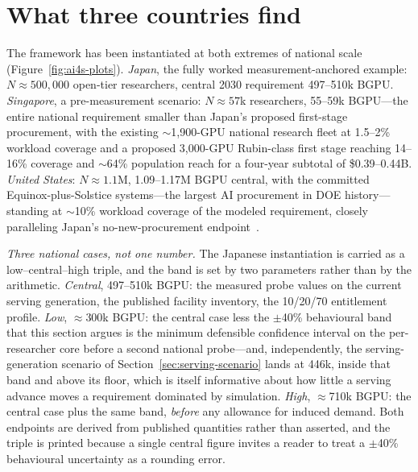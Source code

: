 \section{What three countries find}

The framework has been instantiated at both extremes of national scale (Figure~\ref{fig:ai4s-plots}). \emph{Japan}, the fully worked measurement-anchored example: $N\approx 500{,}000$ open-tier researchers, central 2030 requirement 497--510k BGPU. \emph{Singapore}, a pre-measurement scenario: $N\approx 57$k researchers, 55--59k BGPU---the entire national requirement smaller than Japan's proposed first-stage procurement, with the existing $\sim$1,900-GPU national research fleet at 1.5--2\% workload coverage and a proposed 3,000-GPU Rubin-class first stage reaching 14--16\% coverage and $\sim$64\% population reach for a four-year subtotal of \$0.39--0.44B. \emph{United States}: $N\approx 1.1$M, 1.09--1.17M BGPU central, with the committed Equinox-plus-Solstice systems---the largest AI procurement in DOE history---standing at $\sim$10\% workload coverage of the modeled requirement, closely paralleling Japan's no-new-procurement endpoint~\cite{ai4s-framework}.

\emph{Three national cases, not one number.} The Japanese instantiation is carried as a low--central--high triple, and the band is set by two parameters rather than by the arithmetic. \emph{Central}, 497--510k BGPU: the measured probe values on the current serving generation, the published facility inventory, the 10/20/70 entitlement profile. \emph{Low}, $\approx$300k BGPU: the central case less the $\pm$40\% behavioural band that this section argues is the minimum defensible confidence interval on the per-researcher core before a second national probe---and, independently, the serving-generation scenario of Section~\ref{sec:serving-scenario} lands at 446k, inside that band and above its floor, which is itself informative about how little a serving advance moves a requirement dominated by simulation. \emph{High}, $\approx$710k BGPU: the central case plus the same band, \emph{before} any allowance for induced demand. Both endpoints are derived from published quantities rather than asserted, and the triple is printed because a single central figure invites a reader to treat a $\pm$40\% behavioural uncertainty as a rounding error.

